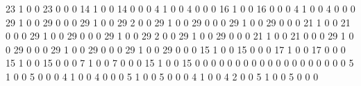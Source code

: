 23
1
0
0
23
0
0
0
14
1
0
0
14
0
0
0
4
1
0
0
4
0
0
0
16
1
0
0
16
0
0
0
4
1
0
0
4
0
0
0
29
1
0
0
29
0
0
0
29
1
0
0
29
2
0
0
29
1
0
0
29
0
0
0
29
1
0
0
29
0
0
0
21
1
0
0
21
0
0
0
29
1
0
0
29
0
0
0
29
1
0
0
29
2
0
0
29
1
0
0
29
0
0
0
21
1
0
0
21
0
0
0
29
1
0
0
29
0
0
0
29
1
0
0
29
0
0
0
29
1
0
0
29
0
0
0
15
1
0
0
15
0
0
0
17
1
0
0
17
0
0
0
15
1
0
0
15
0
0
0
7
1
0
0
7
0
0
0
15
1
0
0
15
0
0
0
0
0
0
0
0
0
0
0
0
0
0
0
0
0
0
0
5
1
0
0
5
0
0
0
4
1
0
0
4
0
0
0
5
1
0
0
5
0
0
0
4
1
0
0
4
2
0
0
5
1
0
0
5
0
0
0
